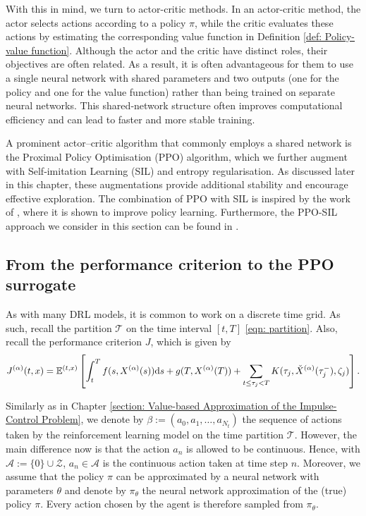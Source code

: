 With this in mind, we turn to actor-critic methods. In an actor-critic method, the actor selects actions according to a policy $\pi$, while the critic evaluates these actions by estimating the corresponding value function in Definition \ref{def: Policy-value function}. Although the actor and the critic have distinct roles, their objectives are often related. As a result, it is often advantageous for them to use a single neural network with shared parameters and two outputs (one for the policy and one for the value function) rather than being trained on separate neural networks. This shared‑network structure often improves computational efficiency and can lead to faster and more stable training. 

A prominent actor–critic algorithm that commonly employs a shared network is the Proximal Policy Optimisation (PPO) algorithm, which we further augment with Self‑imitation Learning (SIL) and entropy regularisation. As discussed later in this chapter, these augmentations provide additional stability and encourage effective exploration. The combination of PPO with SIL is inspired by the work of \textcite{oh2018self}, where it is shown to improve policy learning. Furthermore, the PPO-SIL approach we consider in this section can be found in \cite{jain2025impulsecode, jain2025impulse}. 

\subsection{From the performance criterion to the PPO surrogate}
As with many DRL models, it is common to work on a discrete time grid. As such, recall the partition $\mathcal{T}$ on the time interval $[t,T]$ \eqref{eqn: partition}. Also, recall the performance criterion $J$, which is given by
\begin{equation*}
    J^{(\alpha)}(t,x) = \mathbb{E}^{(t,x)} \left[ \int_t^T f(s,X^{(\alpha)}(s)) \mathrm{d} s + g(T,X^{(\alpha)}(T)) + \sum_{t \leq \tau_j < T} K(\tau_j, \check{X}^{(\alpha)}(\tau_j^-), \zeta_j) \right].
\end{equation*}

Similarly as in Chapter \ref{section: Value-based Approximation of the Impulse-Control Problem}, we denote by $\beta:=(a_0, a_1, \ldots, a_{N_t})$ the sequence of actions taken by the reinforcement learning model on the time partition $\mathcal{T}$. However, the main difference now is that the action $a_n$ is allowed to be continuous. Hence, with $\mathcal{A} := \{0\}\cup \mathcal{Z}$, $a_n \in \mathcal{A}$ is the continuous action taken at time step $n$. Moreover, we assume that the policy $\pi$ can be approximated by a neural network with parameters $\theta$ and denote by $\pi_\theta$ the neural network approximation of the (true) policy $\pi$. Every action chosen by the agent is therefore sampled from $\pi_\theta$. 


